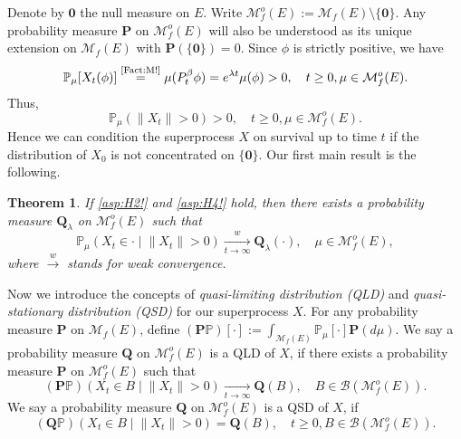 \documentclass[12pt,a4paper]{amsart}
\numberwithin{equation}{section}
\theoremstyle{plain}
\newtheorem{thm}{Theorem}[section]
\theoremstyle{definition}
\theoremstyle{remark}
\begin{document}
	Denote by $\mathbf 0$ the null measure on $E$. 
	Write $\mathcal M_f^o(E) := \mathcal M_f(E)\setminus \{ \mathbf 0\}$. 
	Any probability measure $\mathbf P$ on $\mathcal M_f^o(E)$ will also be understood as its unique extension on $\mathcal M_f(E)$ with  $\mathbf P(\{\mathbf 0\}) = 0$. 
	Since $\phi$ is strictly positive, we have
\begin{equation}
	\mathbb P_\mu[X_t(\phi)]
	\overset{\text{\eqref{Fact:M!}}}= \mu(P_t^\beta \phi)
	=e^{\lambda t}\mu(\phi)>0, \quad t\geq 0, \mu \in \mathcal M_f^o(E).
\end{equation}
	Thus,
\begin{equation}  \label{lem:Nd!}
		\mathbb P_\mu(\|X_t\| > 0) > 0,\quad t\geq 0,\mu \in \mathcal M_f^o(E).
\end{equation}
Hence we can condition the superprocess $X$ on survival up to time $t$ if  the distribution of $X_0$ is not concentrated on $\{\mathbf 0\}$.
	Our first main result is the following.
	
\begin{thm} \label{Theorem:Y:H1:H2:H3:H4}
	If \eqref{asp:H2!} and \eqref{asp:H4!} hold, then there exists a probability measure $\mathbf Q_\lambda$
	on $\mathcal M_f^o(E)$ such that
\begin{equation}
 	\mathbb P_\mu \left(X_t \in \cdot \middle| \|X_t\| > 0 \right) \xrightarrow[t\to \infty]{w} \mathbf Q_\lambda(\cdot),
 	\quad \mu \in \mathcal M_f^o(E),
\end{equation}
	where $\xrightarrow{w}$ stands for weak convergence.
\end{thm}

	Now we introduce the concepts of \emph{quasi-limiting distribution (QLD)} and \emph{quasi-stationary distribution (QSD)} for our superprocess $X$.
	For any probability measure $\mathbf P$ on $\mathcal M_f(E)$, define $(\mathbf P\mathbb P)[\cdot] := \int_{\mathcal M_f(E)} \mathbb P_\mu[\cdot] \mathbf P(d\mu)$.
	We say a probability measure $\mathbf Q$ on $\mathcal M^o_f(E)$ is a QLD of $X$, if there exists a probability measure $\mathbf P$ on 
	$\mathcal M_f^o(E)$ such that
\[
	(\mathbf P\mathbb P)\left(X_t \in B \middle| \|X_t\|>0\right) \xrightarrow[t\to \infty]{} \mathbf Q(B),
	\quad B\in \mathcal B(\mathcal M^o_f(E)).
\]
	We say a probability measure $\mathbf Q$ on $\mathcal M^o_f(E)$ is a QSD of $X$, if
\[
	(\mathbf Q \mathbb P) \left( X_t \in B \middle | \|X_t\|>0 \right) = \mathbf Q(B),
	\quad t\geq 0, B \in \mathcal B(\mathcal M^o_f(E)).
\]
	
\end{document}
